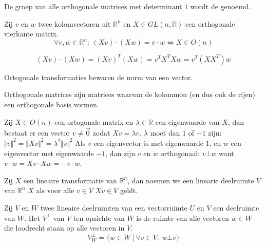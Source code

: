 \documentclass[main.tex]{subfiles}
\begin{document}
\begin{de}
  De groep van alle orthogonale matrices met determinant $1$ wordt de  genoemd.
\end{de}

\begin{st}
  Zij $v$ en $w$ twee kolomvectoren uit $\mathbb{R}^{n}$ en $X \in GL(n,\mathbb{R})$ een orthogonale vierkante matrix.
  \[ \forall v,w \in \mathbb{R}^{n}:\ (Xv)\cdot(Xw) = v \cdot w \Leftrightarrow X \in O(n) \]

\[ (Xv) \cdot (Xw) = (Xv)^{T}(Xw) = v^{T}X^{T}Xw = v^{T}(XX^{T})w \]
\end{st}

\begin{st}
  Ortogonale transformaties bewaren de norm van een vector.
\end{st}

\begin{de}
  Orthogonale matrices zijn matrices waarvan de kolommon (en dus ook de rijen) een orthogonale basis vormen.
\end{de}

\begin{st}
  Zij $X\in O(n)$ een ortogonale matrix en $\lambda\in \mathbb{R}$ een eigenwaarde van $X$, dan bestaat er een vector $v\neq \vec{0}$ zodat $Xv = \lambda v$.
  $\lambda$ moet dan $1$ of $-1$ zijn: $ \Vert v \Vert^{2} = \Vert X v \Vert^{2} = \lambda^{2}\Vert v\Vert^{2}$
  Als $v$ een eigenvector is met eigenwaarde $1$, en $w$ een eigenvector met eigenwaarde $-1$, dan zijn $v$ en $w$ orthogonaal: $v \bot w$
  want $v \cdot w = Xv \cdot Xw = -v \cdot w$.
\end{st}

\begin{de}
  Zij $X$ een lineaire transformatie van $\mathbb{R}^{n}$, dan noemen we een linearie deelruimte $V$ van $\mathbb{R}^{n}$  $X$ als voor alle $v\in V$ $Xv \in V$ geldt.
\end{de}

\begin{de}
  Zij $V$ en $W$ twee lineaire deelruimten van een vectorruimte $U$ en $V$ een deelruimte van $W$.
  Het  $V^{\bot}$ van $V$ ten opzichte van $W$ is de ruimte van alle vectoren $w\in W$ die loodrecht staan op alle vectoren in $V$.
  \[ V^{\bot}_{W} = \{ w \in W\ |\ \forall v \in V:\ w \bot v \} \]
\end{de}
\end{document}
